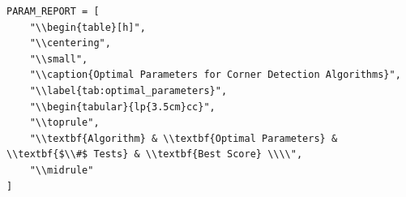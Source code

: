 \documentclass[journal]{IEEEtran}
\begin{document}
\begin{lstlisting}[style=python, caption={Setup Parameters}, label={lst:params}]
PARAM_REPORT = [
    "\\begin{table}[h]",
    "\\centering",
    "\\small",
    "\\caption{Optimal Parameters for Corner Detection Algorithms}",
    "\\label{tab:optimal_parameters}",
    "\\begin{tabular}{lp{3.5cm}cc}",
    "\\toprule",
    "\\textbf{Algorithm} & \\textbf{Optimal Parameters} & \\textbf{$\\#$ Tests} & \\textbf{Best Score} \\\\",
    "\\midrule"
]
\end{lstlisting}
\bigskip
\bigskip
\end{document}
